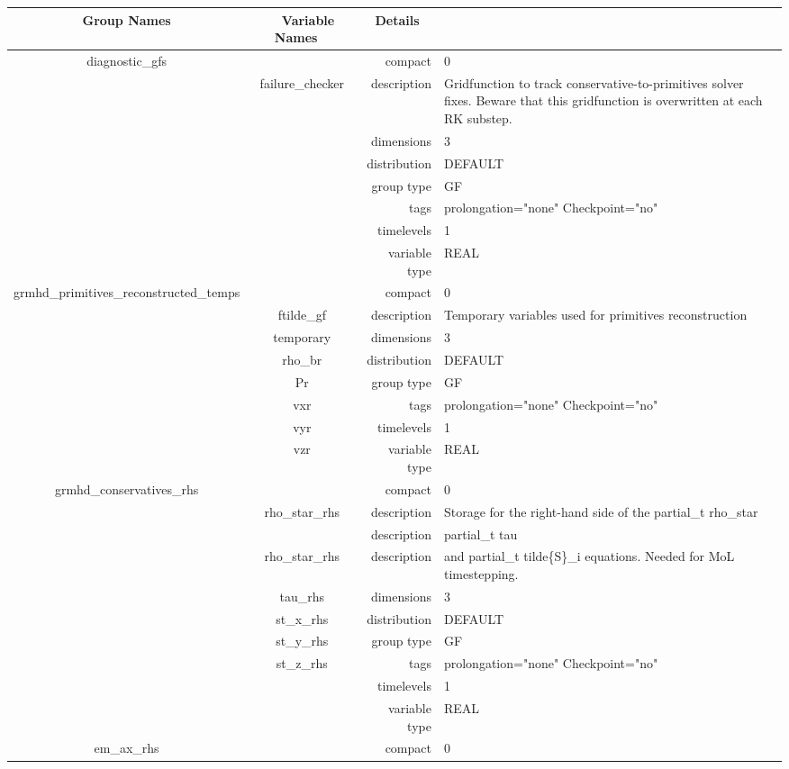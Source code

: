 \begin{tabular*}{150mm}{|c|c@{\extracolsep{\fill}}|rl|} \hline 
~ {\bf Group Names} ~ & ~ {\bf Variable Names} ~  &{\bf Details} ~ & ~\\ 
\hline 
diagnostic\_gfs &  & compact & 0 \\ 
 & failure\_checker & description & Gridfunction to track conservative-to-primitives solver fixes. Beware that this gridfunction is overwritten at each RK substep. \\ 
 &  & dimensions & 3 \\ 
 &  & distribution & DEFAULT \\ 
 &  & group type & GF \\ 
 &  & tags & prolongation="none" Checkpoint="no" \\ 
 &  & timelevels & 1 \\ 
 &  & variable type & REAL \\ 
\hline 
grmhd\_primitives\_reconstructed\_temps &  & compact & 0 \\ 
 & ftilde\_gf & description & Temporary variables used for primitives reconstruction \\ 
 & temporary & dimensions & 3 \\ 
 & rho\_br & distribution & DEFAULT \\ 
 & Pr & group type & GF \\ 
 & vxr & tags & prolongation="none" Checkpoint="no" \\ 
 & vyr & timelevels & 1 \\ 
 & vzr & variable type & REAL \\ 
\hline 
grmhd\_conservatives\_rhs &  & compact & 0 \\ 
 & rho\_star\_rhs & description & Storage for the right-hand side of the partial\_t rho\_star \\ 
& ~ & description &  partial\_t tau \\ 
 & rho\_star\_rhs & description &  and partial\_t tilde\{S\}\_i equations. Needed for MoL timestepping. \\ 
 & tau\_rhs & dimensions & 3 \\ 
 & st\_x\_rhs & distribution & DEFAULT \\ 
 & st\_y\_rhs & group type & GF \\ 
 & st\_z\_rhs & tags & prolongation="none" Checkpoint="no" \\ 
 &  & timelevels & 1 \\ 
 &  & variable type & REAL \\ 
\hline 
em\_ax\_rhs &  & compact & 0 \\ 

\end{tabular*}
